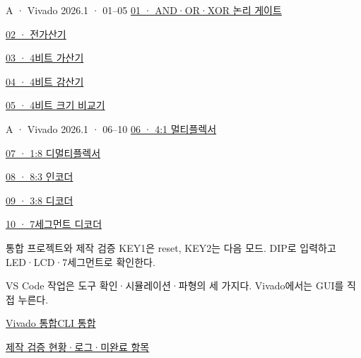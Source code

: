 \begin{frame}[label=lab1-modern]{A · Vivado 2026.1 · 01–05}\relax
\small
\href{04.LAB1_01_LOGIC_GATES_VIVADO.pdf}{01 · AND·OR·XOR 논리 게이트}\par\vspace{0.35cm}
\href{04.LAB1_02_FULL_ADDER_VIVADO.pdf}{02 · 전가산기}\par\vspace{0.35cm}
\href{04.LAB1_03_ADDER4_VIVADO.pdf}{03 · 4비트 가산기}\par\vspace{0.35cm}
\href{04.LAB1_04_SUBTRACTOR4_VIVADO.pdf}{04 · 4비트 감산기}\par\vspace{0.35cm}
\href{04.LAB1_05_COMPARATOR4_VIVADO.pdf}{05 · 4비트 크기 비교기}\par\vspace{0.35cm}

\end{frame}

\begin{frame}{A · Vivado 2026.1 · 06–10}\relax
\small
\href{04.LAB1_06_MUX4TO1_VIVADO.pdf}{06 · 4:1 멀티플렉서}\par\vspace{0.35cm}
\href{04.LAB1_07_DEMUX1TO8_VIVADO.pdf}{07 · 1:8 디멀티플렉서}\par\vspace{0.35cm}
\href{04.LAB1_08_ENCODER8TO3_VIVADO.pdf}{08 · 8:3 인코더}\par\vspace{0.35cm}
\href{04.LAB1_09_DECODER3TO8_VIVADO.pdf}{09 · 3:8 디코더}\par\vspace{0.35cm}
\href{04.LAB1_10_SEVEN_SEGMENT_VIVADO.pdf}{10 · 7세그먼트 디코더}\par\vspace{0.35cm}

\end{frame}

\begin{frame}{통합 프로젝트와 제작 검증}\relax
\small
KEY1은 reset, KEY2는 다음 모드. DIP로 입력하고 LED·LCD·7세그먼트로 확인한다.\par\vspace{0.22cm}VS Code 작업은 도구 확인·시뮬레이션·파형의 세 가지다. Vivado에서는 GUI를 직접 누른다.\par\href{04.LAB1_10A_INTEGRATED_VIVADO.pdf}{Vivado 통합}\quad\href{04.LAB1_10B_INTEGRATED_CLI.pdf}{CLI 통합}\par\vspace{0.4cm}\href{https://github.com/Glaysia/ece2_26_2_2/blob/daily/0910/example/fpga_projects_hdl/LAB1/docs/validation.md}{제작 검증 현황·로그·미완료 항목}
\end{frame}

